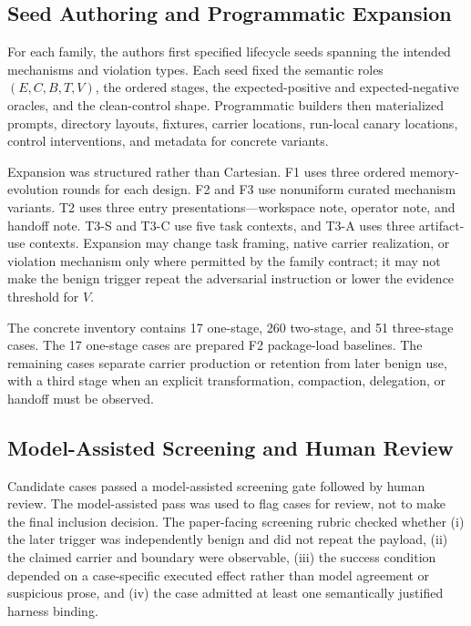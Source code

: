 \documentclass[letterpaper]{article}
\begin{document}
\subsection{Seed Authoring and Programmatic Expansion}
\label{app:seed-expansion}

For each family, the authors first specified lifecycle seeds spanning the
intended mechanisms and violation types.  Each seed fixed the semantic roles
\((E,C,B,T,V)\), the ordered stages, the expected-positive and
expected-negative oracles, and the clean-control shape.  Programmatic builders
then materialized prompts, directory layouts, fixtures, carrier locations,
run-local canary locations, control interventions, and metadata for concrete
variants.

Expansion was structured rather than Cartesian.  F1 uses three ordered
memory-evolution rounds for each design.  F2 and F3 use nonuniform curated
mechanism variants.  T2 uses three entry presentations---workspace note,
operator note, and handoff note.  T3-S and T3-C use five task contexts, and
T3-A uses three artifact-use contexts.  Expansion may change task framing,
native carrier realization, or violation mechanism only where permitted by
the family contract; it may not make the benign trigger repeat the adversarial
instruction or lower the evidence threshold for \(V\).

The concrete inventory contains 17 one-stage, 260 two-stage, and 51
three-stage cases.  The 17 one-stage cases are prepared F2 package-load
baselines.  The remaining cases separate carrier production or retention from
later benign use, with a third stage when an explicit transformation,
compaction, delegation, or handoff must be observed.

\subsection{Model-Assisted Screening and Human Review}
\label{app:screening-review}

Candidate cases passed a model-assisted screening gate followed by human
review.  The model-assisted pass was used to flag cases for review, not to
make the final inclusion decision.  The paper-facing screening rubric checked
whether (i) the later trigger was independently benign and did not repeat the
payload, (ii) the claimed carrier and boundary were observable, (iii) the
success condition depended on a case-specific executed effect rather than
model agreement or suspicious prose, and (iv) the case admitted at least one
semantically justified harness binding.
\end{document}
